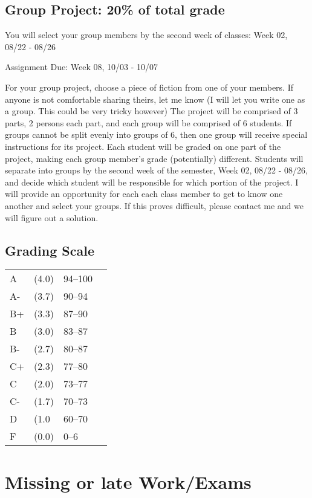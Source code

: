 \documentclass[11pt,]{article}
\begin{document}
\subsection{Group Project: 20\% of total
grade}\label{group-project-20-of-total-grade}

You will select your group members by the second week of classes: Week
02, 08/22 - 08/26

Assignment Due: Week 08, 10/03 - 10/07

For your group project, choose a piece of fiction from one of your
members. If anyone is not comfortable sharing theirs, let me know (I
will let you write one as a group. This could be very tricky however)
The project will be comprised of 3 parts, 2 persons each part, and each
group will be comprised of 6 students. If groups cannot be split evenly
into groups of 6, then one group will receive special instructions for
its project. Each student will be graded on one part of the project,
making each group member's grade (potentially) different. Students will
separate into groups by the second week of the semester, Week 02, 08/22
- 08/26, and decide which student will be responsible for which portion
of the project. I will provide an opportunity for each each class member
to get to know one another and select your groups. If this proves
difficult, please contact me and we will figure out a solution.

\subsection{Grading Scale}\label{grading-scale}

\begin{longtable}[]{@{}llll@{}}
\toprule\noalign{}
\endhead
\bottomrule\noalign{}
\endlastfoot
A & (4.0) & 94--100 & \\
A- & (3.7) & 90--94 & \\
B+ & (3.3) & 87--90 & \\
B & (3.0) & 83--87 & \\
B- & (2.7) & 80--87 & \\
C+ & (2.3) & 77--80 & \\
C & (2.0) & 73--77 & \\
C- & (1.7) & 70--73 & \\
D & (1.0 & 60--70 & \\
F & (0.0) & 0--6 & \\
\end{longtable}

\section{Missing or late Work/Exams}\label{missing-or-late-workexams}
\end{document}
